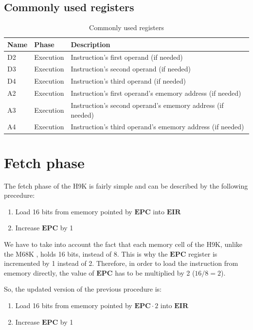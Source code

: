 \documentclass[11pt, a4paper]{article}
\begin{document}
\subsection{Commonly used registers}
\begin{table}[h!]
	\centering
	{
		\selectfont
		\begin{tabular}{ | l | l | l | }
			\hline
			\textbf{Name} & \textbf{Phase} & \textbf{Description} \\
			\hline
			D2 & Execution & Instruction's first operand (if needed) \\
			\hline
			D3 & Execution & Instruction's second operand (if needed) \\
			\hline
			D4 & Execution & Instruction's third operand (if needed) \\
			\hline
			A2 & Execution & Instruction's first operand's ememory address (if needed) \\
			\hline
			A3 & Execution & Instruction's second operand's ememory address (if needed) \\
			\hline
			A4 & Execution & Instruction's third operand's ememory address (if needed) \\
			\hline
		\end{tabular}
	}
	\caption{Commonly used registers}
	\label{table:registers}
\end{table}

\pagebreak
\section{Fetch phase}
The fetch phase of the H9K is fairly simple and can be described by the following
precedure:
\begin{enumerate}
	\item Load 16 bits from ememory pointed by $\mathbf{EPC}$ into $\mathbf{EIR}$
	\item Increase $\mathbf{EPC}$ by 1
\end{enumerate}
We have to take into account the fact that each memory cell of the H9K, unlike the M68K , holds 16
bits, instead of 8. This is why the $\mathbf{EPC}$ register is incremented by 1
instead of 2. Therefore, in order to load the instruction from ememory directly, the value of
$\mathbf{EPC}$ has to be multiplied by 2 ($16 / 8 = 2$).

So, the updated version of the previous procedure is:
\begin{enumerate}
	\item Load 16 bits from ememory pointed by $\mathbf{EPC} \cdot 2$ into $\mathbf{EIR}$
	\item Increase $\mathbf{EPC}$ by 1
\end{enumerate}
\end{document}
